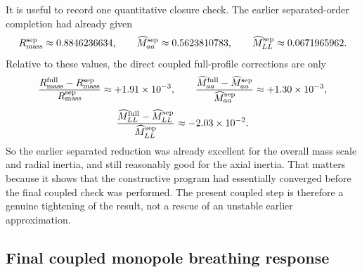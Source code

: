 \documentclass[11pt]{article}
\begin{document}
It is useful to record one quantitative closure check.
The earlier separated-order completion had already given
\begin{equation}
R_{\rm mass}^{\rm sep}\approx 0.8846236634,
\qquad
\widehat M_{aa}^{\rm sep}\approx 0.5623810783,
\qquad
\widehat M_{LL}^{\rm sep}\approx 0.0671965962.
\label{eq:family1-final-separated-values}
\end{equation}
Relative to these values, the direct coupled full-profile corrections are only
\begin{equation}
\frac{R_{\rm mass}^{\rm full}-R_{\rm mass}^{\rm sep}}{R_{\rm mass}^{\rm sep}}
\approx +1.91\times 10^{-3},
\qquad
\frac{\widehat M_{aa}^{\rm full}-\widehat M_{aa}^{\rm sep}}{\widehat M_{aa}^{\rm sep}}
\approx +1.30\times 10^{-3},
\label{eq:family1-final-separated-mass-aa}
\end{equation}
\begin{equation}
\frac{\widehat M_{LL}^{\rm full}-\widehat M_{LL}^{\rm sep}}{\widehat M_{LL}^{\rm sep}}
\approx -2.03\times 10^{-2}.
\label{eq:family1-final-separated-LL}
\end{equation}
So the earlier separated reduction was already excellent for the overall mass scale and
radial inertia, and still reasonably good for the axial inertia.
That matters because it shows that the constructive program had essentially converged
before the final coupled check was performed.
The present coupled step is therefore a genuine tightening of the result, not a rescue of
an unstable earlier approximation.

\subsection{Final coupled monopole breathing response}
\label{app:family1-final-monopole}
\end{document}
